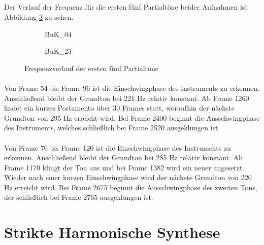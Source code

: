 \subsection{}
Der Verlauf der Frequenz für die ersten fünf Partialtöne beider Aufnahmen ist Abbildung \ref{fig:freq} zu sehen.

\begin{figure}[H]
    \centering
    \begin{subfigure}{.5\textwidth}
        \centering
        \caption{BuK\_04}
        \scalebox{0.5}{}
        \label{fig:freq04}
    \end{subfigure}%
    \begin{subfigure}{.5\textwidth}
        \centering
        \caption{BuK\_23}
        \scalebox{0.5}{}
        \label{fig:freq23}
    \end{subfigure}
    \caption{Frequenzverlauf der ersten fünf Partialtöne}
    \label{fig:freq}
\end{figure}

\paragraph{}
Von Frame 54 bis Frame 96 ist die Einschwingphase des Instruments zu erkennen.
Anschließend bleibt der Grundton bei 221 Hz relativ konstant.
Ab Frame 1260 findet ein kurzes Portamento über 30 Frames statt, woraufhin der nächste Grundton von 295 Hz erreicht wird.
Bei Frame 2400 beginnt die Ausschwingphase des Instruments, welches schließlich bei Frame 2520 ausgeklungen ist.

\paragraph{}
Von Frame 70 bis Frame 120 ist die Einschwingphase des Instruments zu erkennen.
Anschließend bleibt der Grundton bei 285 Hz relativ konstant.
Ab Frame 1170 klingt der Ton aus und bei Frame 1382 wird ein neuer angesetzt.
Wieder nach einer kurzen Einschwingphase wird der nächste Grundton von 220 Hz erreicht wird.
Bei Frame 2675 beginnt die Ausschwingphase des zweiten Tons, der schließlich bei Frame 2765 ausgeklungen ist.


\section{Strikte Harmonische Synthese}
\label{sec:2}

